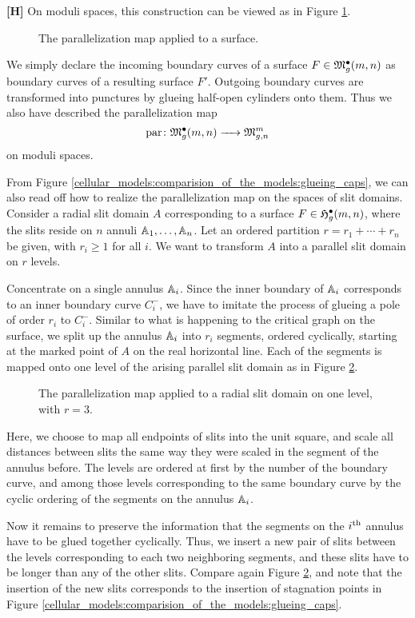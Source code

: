 {\bf [H]} On moduli spaces, this construction can be viewed as in Figure \ref{cellular_parallelization_on_modspc}.
\begin{figure}[ht]
\centering
\def\svgwidth{0.8\columnwidth}

\caption{\label{cellular_parallelization_on_modspc} The parallelization map applied to a surface.}
\end{figure}
We simply declare the incoming boundary curves of a surface $F \in \mathfrak{M}^\bullet_g(m, n)$ as boundary curves of a resulting surface $F'$.
Outgoing boundary curves are transformed into punctures by glueing half-open cylinders onto them.
Thus we also have described the parallelization map 
\[
  \operatorname{par} \colon \mathfrak{M}^\bullet_g(m, n) \xrightarrow{\hspace{6pt}{}\hspace{6pt}} \mathfrak{M}^m_{g,n}
\]
on moduli spaces.

From Figure \ref{cellular_models:comparision_of_the_models:glueing_caps}, we can also read off how to realize the parallelization map on the spaces of slit domains.
Consider a radial slit domain $A$ corresponding to a surface $F \in \mathfrak{H}^{\bullet}_g(m, n)$,
where the slits reside on $n$ annuli $\mathbb A_1, \dotsc, \mathbb A_n$.
Let an ordered partition $r = r_1 + \dotsb + r_n$ be given, with $r_i \geq 1$ for all $i$. 
We want to transform $A$ into a parallel slit domain on $r$ levels.

Concentrate on a single annulus $\mathbb A_i$.
Since the inner boundary of $\mathbb A_i$ corresponds to an inner boundary curve $C^-_i$, 
we have to imitate the process of glueing a pole of order $r_i$ to $C^-_i$.
Similar to what is happening to the critical graph on the surface, we split up the annulus $\mathbb A_i$ into $r_i$ segments,
ordered cyclically, starting at the marked point of $A$ on the real horizontal line.
Each of the segments is mapped onto one level of the arising parallel slit domain as in Figure \ref{cellular_parallelization_on_complexes}.
\begin{figure}[ht]
\centering
{}
\caption{\label{cellular_parallelization_on_complexes} The parallelization map applied to a radial slit domain on one level, with $r = 3$.}
\end{figure}
Here, we choose to map all endpoints of slits into the unit square, and scale all distances between slits the same way they were scaled in the segment of the annulus before.
The levels are ordered at first by the number of the boundary curve, 
and among those levels corresponding to the same boundary curve by the cyclic ordering of the segments on the annulus $\mathbb A_i$.

Now it remains to preserve the information that the segments on the $i^{\text{th}}$ annulus have to be glued together cyclically.
Thus, we insert a new pair of slits between the levels corresponding to each two neighboring segments,
and these slits have to be longer than any of the other slits.
Compare again Figure \ref{cellular_parallelization_on_complexes},
and note that the insertion of the new slits corresponds to the insertion of stagnation points in Figure \ref{cellular_models:comparision_of_the_models:glueing_caps}.

